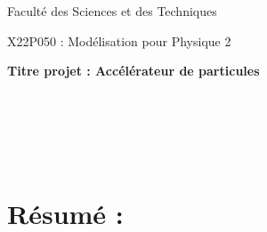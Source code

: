 \documentclass[a4paper,11pt]{article}			%
\begin{document}
\vspace*{-2cm}

\centerline{\LARGE Faculté des Sciences et des Techniques}
  \vspace*{0.5cm}  
\centerline{\LARGE X22P050 : Modélisation pour Physique  2 }  
\vspace*{0.5cm}  

\centerline{\bf\Large Titre projet : Accélérateur de particules }
\vspace*{2cm}
\noindent
{}\\   \\
\vspace*{2cm}
\\   \\


\section*{Résumé :}
\end{document}
